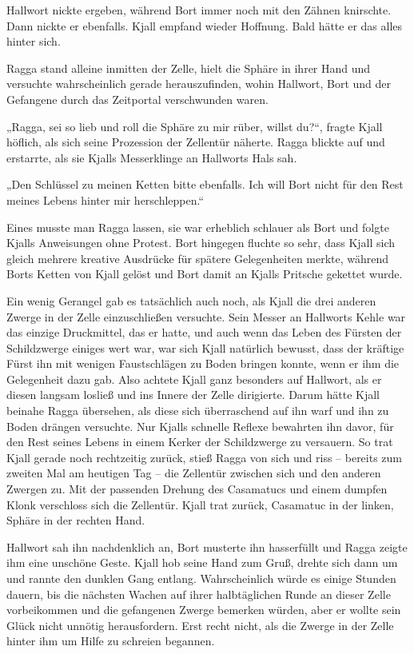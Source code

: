\documentclass[10pt, a4paper, oneside]{book}
\begin{document}
Hallwort nickte ergeben, während Bort immer noch mit den Zähnen knirschte. Dann nickte er ebenfalls. Kjall empfand wieder Hoffnung. Bald hätte er das alles hinter sich.\bigskip



Ragga stand alleine inmitten der Zelle, hielt die Sphäre in ihrer Hand und versuchte wahrscheinlich gerade herauszufinden, wohin Hallwort, Bort und der Gefangene durch das Zeitportal verschwunden waren.

„Ragga, sei so lieb und roll die Sphäre zu mir rüber, willst du?“, fragte Kjall höflich, als sich seine Prozession der Zellentür näherte. Ragga blickte auf und erstarrte, als sie Kjalls Messerklinge an Hallworts Hals sah.

„Den Schlüssel zu meinen Ketten bitte ebenfalls. Ich will Bort nicht für den Rest meines Lebens hinter mir herschleppen.“

Eines musste man Ragga lassen, sie war erheblich schlauer als Bort und folgte Kjalls Anweisungen ohne Protest. Bort hingegen fluchte so sehr, dass Kjall sich gleich mehrere kreative Ausdrücke für spätere Gelegenheiten merkte, während Borts Ketten von Kjall gelöst und Bort damit an Kjalls Pritsche gekettet wurde.

Ein wenig Gerangel gab es tatsächlich auch noch, als Kjall die drei anderen Zwerge in der Zelle einzuschließen versuchte. Sein Messer an Hallworts Kehle war das einzige Druckmittel, das er hatte, und auch wenn das Leben des Fürsten der Schildzwerge einiges wert war, war sich Kjall natürlich bewusst, dass der kräftige Fürst ihn mit wenigen Faustschlägen zu Boden bringen konnte, wenn er ihm die Gelegenheit dazu gab. Also achtete Kjall ganz besonders auf Hallwort, als er diesen langsam losließ und ins Innere der Zelle dirigierte. Darum hätte Kjall beinahe Ragga übersehen, als diese sich überraschend auf ihn warf und ihn zu Boden drängen versuchte. Nur Kjalls schnelle Reflexe bewahrten ihn davor, für den Rest seines Lebens in einem Kerker der Schildzwerge zu versauern. So trat Kjall gerade noch rechtzeitig zurück, stieß Ragga von sich und riss – bereits zum zweiten Mal am heutigen Tag – die Zellentür zwischen sich und den anderen Zwergen zu. Mit der passenden Drehung des Casamatucs und einem dumpfen Klonk verschloss sich die Zellentür. Kjall trat zurück, Casamatuc in der linken, Sphäre in der rechten Hand.

Hallwort sah ihn nachdenklich an, Bort musterte ihn hasserfüllt und Ragga zeigte ihm eine unschöne Geste. Kjall hob seine Hand zum Gruß, drehte sich dann um und rannte den dunklen Gang entlang. Wahrscheinlich würde es einige Stunden dauern, bis die nächsten Wachen auf ihrer halbtäglichen Runde an dieser Zelle vorbeikommen und die gefangenen Zwerge bemerken würden, aber er wollte sein Glück nicht unnötig herausfordern. Erst recht nicht, als die Zwerge in der Zelle hinter ihm um Hilfe zu schreien begannen.
\end{document}
